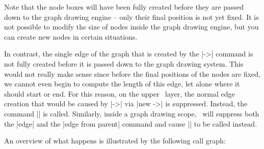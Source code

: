 Note that the node boxes will have been fully created before they are passed
down to the graph drawing engine -- only their final position is not yet fixed.
It is not possible to modify the size of nodes inside the graph drawing engine,
but you can create new nodes in certain situations.

In contrast, the single edge of the graph that is created by the |->| command
is not fully created before it is passed down to the graph drawing system. This
would not really make sense since before the final positions of the nodes are
fixed, we cannot even begin to compute the length of this edge, let alone where
it should start or end. For this reason, on the upper \tikzname\ layer, the
normal edge creation that would be caused by |->| via |new ->| is suppressed.
Instead, the command |\pgfgdedge| is called. Similarly, inside a graph drawing
scope, \tikzname\ will suppress both the |edge| and the |edge from parent|
command and cause |\pgfgdedge| to be called instead.

An overview of what happens is illustrated by the following call graph:

\bigskip

